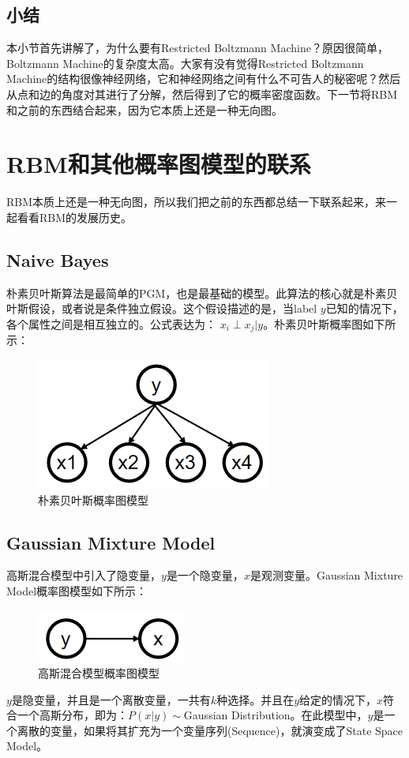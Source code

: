 \documentclass[a4paper]{article}
\begin{document}
\subsection{小结}
本小节首先讲解了，为什么要有Restricted Boltzmann Machine？原因很简单，Boltzmann Machine的复杂度太高。大家有没有觉得Restricted Boltzmann Machine的结构很像神经网络，它和神经网络之间有什么不可告人的秘密呢？然后从点和边的角度对其进行了分解，然后得到了它的概率密度函数。下一节将RBM和之前的东西结合起来，因为它本质上还是一种无向图。

\section{RBM和其他概率图模型的联系}
RBM本质上还是一种无向图，所以我们把之前的东西都总结一下联系起来，来一起看看RBM的发展历史。

\subsection{Naive Bayes}
朴素贝叶斯算法是最简单的PGM，也是最基础的模型。此算法的核心就是朴素贝叶斯假设，或者说是条件独立假设。这个假设描述的是，当label $y$已知的情况下，各个属性之间是相互独立的。公式表达为：
$x_i\perp x_j|y$。朴素贝叶斯概率图如下所示：
\begin{figure}[H]
    \centering
    \includegraphics[width=.35\textwidth]{微信图片_20200229202910.png}
    \caption{朴素贝叶斯概率图模型}
    \label{fig:my_label_1}
\end{figure}

\subsection{Gaussian Mixture Model}
高斯混合模型中引入了隐变量，$y$是一个隐变量，$x$是观测变量。Gaussian Mixture Model概率图模型如下所示：
\begin{figure}[H]
    \centering
    \includegraphics[width=.2\textwidth]{微信图片_20200229204430.png}
    \caption{高斯混合模型概率图模型}
    \label{fig:my_label_1}
\end{figure}
\noindent $y$是隐变量，并且是一个离散变量，一共有$k$种选择。并且在$y$给定的情况下，$x$符合一个高斯分布，即为：$P(x|y)\sim$Gaussian Distribution。在此模型中，$y$是一个离散的变量，如果将其扩充为一个变量序列(Sequence)，就演变成了State Space Model。
\end{document}
